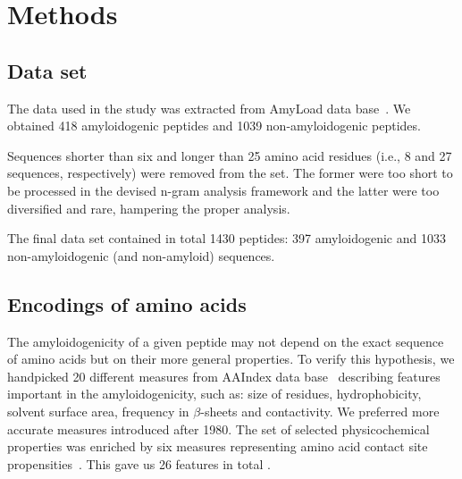 \documentclass[fleqn,10pt,twoside]{gcb15submission}
\begin{document}
\section{Methods}
\subsection{Data set}

The data used in the study was extracted from AmyLoad data 
base~\citep{wozniak_amyload:_2015}. We obtained 418 amyloidogenic peptides and 
1039 non-amyloidogenic peptides.

  Sequences shorter than six and longer than 25 amino acid residues (i.e., 8 and 
27 sequences, respectively) were removed from the set. The former were too short 
to be processed in the devised n-gram analysis framework and the latter were too 
diversified and rare, hampering the proper analysis.

  The final data set contained in total 1430 peptides: 397 amyloidogenic 
%
%
%
%
%
and 1033 non-amyloidogenic (and non-amyloid) sequences. 

\subsection{Encodings of amino acids}

The amyloidogenicity of a given peptide may not depend on the exact sequence of 
amino acids but on their more general properties. To verify this hypothesis, we 
handpicked 20 different measures from AAIndex data base~\citep{kawashima_aaindex:_2008} 
describing features important in the amyloidogenicity, such as: size of 
residues, hydrophobicity, solvent surface area, frequency in $\beta$-sheets and 
contactivity. We preferred more accurate measures introduced after 1980. 
The set of selected physicochemical properties was enriched by 
six measures representing amino acid contact site 
propensities~\cite{wozniak_characteristics_2014}. This gave us  26 features in total .
\end{document}
